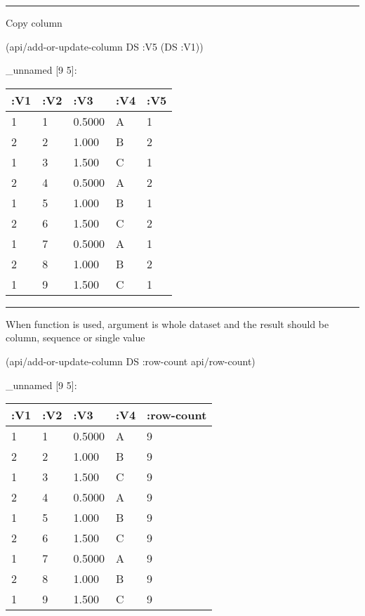\documentclass[]{article}
\newenvironment{Shaded}{\begin{snugshade}}{\end{snugshade}}
\newcommand{\AttributeTok}[1]{\textcolor[rgb]{0.77,0.63,0.00}{#1}}
\newcommand{\NormalTok}[1]{#1}
\begin{document}
\begin{center}\rule{0.5\linewidth}{0.5pt}\end{center}

Copy column

\begin{Shaded}
\begin{Highlighting}[]
\NormalTok{(api/add-or-update-column DS }\AttributeTok{:V5}\NormalTok{ (DS }\AttributeTok{:V1}\NormalTok{))}
\end{Highlighting}
\end{Shaded}

\_unnamed {[}9 5{]}:

\begin{longtable}[]{@{}lllll@{}}
\toprule
:V1 & :V2 & :V3 & :V4 & :V5\tabularnewline
\midrule
\endhead
1 & 1 & 0.5000 & A & 1\tabularnewline
2 & 2 & 1.000 & B & 2\tabularnewline
1 & 3 & 1.500 & C & 1\tabularnewline
2 & 4 & 0.5000 & A & 2\tabularnewline
1 & 5 & 1.000 & B & 1\tabularnewline
2 & 6 & 1.500 & C & 2\tabularnewline
1 & 7 & 0.5000 & A & 1\tabularnewline
2 & 8 & 1.000 & B & 2\tabularnewline
1 & 9 & 1.500 & C & 1\tabularnewline
\bottomrule
\end{longtable}

\begin{center}\rule{0.5\linewidth}{0.5pt}\end{center}

When function is used, argument is whole dataset and the result should
be column, sequence or single value

\begin{Shaded}
\begin{Highlighting}[]
\NormalTok{(api/add-or-update-column DS }\AttributeTok{:row-count}\NormalTok{ api/row-count) }
\end{Highlighting}
\end{Shaded}

\_unnamed {[}9 5{]}:

\begin{longtable}[]{@{}lllll@{}}
\toprule
:V1 & :V2 & :V3 & :V4 & :row-count\tabularnewline
\midrule
\endhead
1 & 1 & 0.5000 & A & 9\tabularnewline
2 & 2 & 1.000 & B & 9\tabularnewline
1 & 3 & 1.500 & C & 9\tabularnewline
2 & 4 & 0.5000 & A & 9\tabularnewline
1 & 5 & 1.000 & B & 9\tabularnewline
2 & 6 & 1.500 & C & 9\tabularnewline
1 & 7 & 0.5000 & A & 9\tabularnewline
2 & 8 & 1.000 & B & 9\tabularnewline
1 & 9 & 1.500 & C & 9\tabularnewline
\bottomrule
\end{longtable}
\end{document}

